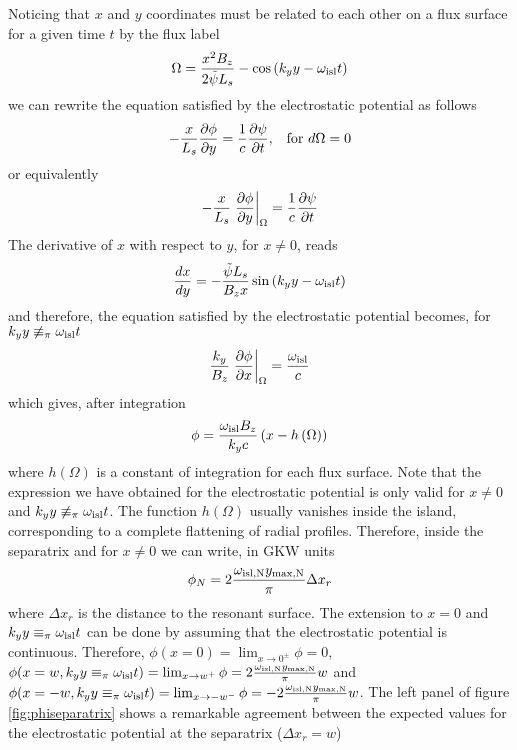 Noticing that $x$ and $y$ coordinates must be related to each other on a flux surface for a given time $t$ by the flux label
\begin{equation}
\Omega = {x^2B_z \over 2\tilde\psi L_s} - \cos\left(k_yy-\omega_{\rm isl}t\right)
\end{equation}
we can rewrite the equation satisfied by the electrostatic potential as follows
\begin{equation}
- {x \over L_s}{\partial\phi\over\partial y} = {1\over c}{\partial \psi\over\partial t},\,\,\,\,\,{\rm for}\,\,d\Omega=0
\end{equation}
or equivalently
\begin{equation}
- {x \over L_s}\left.{\partial\phi\over\partial y}\right\vert_{\Omega} = {1\over c}{\partial \psi\over\partial t}
\end{equation}
The derivative of $x$ with respect to $y$, for $x\ne 0$, reads
\begin{equation}
{dx\over dy} = -{\tilde\psi L_s\over B_z x}\sin\left(k_yy-\omega_{\rm isl}t\right)
\end{equation}
and therefore, the equation satisfied by the electrostatic potential becomes, for $k_yy\not\equiv_\pi\omega_{\rm isl}t$
\begin{equation}
{k_y\over B_z}\left.{\partial\phi\over\partial x}\right\vert_{\Omega} = {\omega_{\rm isl}\over c}
\end{equation}
which gives, after integration
\begin{equation}
\phi = {\omega_{\rm isl}B_z\over k_y c}\left(x-h\left(\Omega\right)\right)
\end{equation}
where $h\left(\Omega\right)$ is a constant of integration for each flux surface. Note that the expression we have obtained for the electrostatic potential is only valid for $x\ne 0$ and $k_yy\not\equiv_\pi\omega_{\rm isl}t$. The function $h\left(\Omega\right)$ usually vanishes inside the island, corresponding to a complete flattening of radial profiles. Therefore, inside the separatrix and for $x\ne 0$ we can write, in GKW units
\begin{equation}
\phi_N = 2{\omega_{\rm isl,N}y_{\rm max,N}\over \pi}\Delta x_r
\end{equation}
where $\Delta x_r$ is the distance to the resonant surface. The extension to $x=0$ and $k_yy\equiv_\pi\omega_{\rm isl}t$ can be done by assuming that the electrostatic potential is continuous. Therefore, $\phi(x=0)=\lim_{x\rightarrow 0^\pm}\phi = 0$, $\phi(x=w,k_yy\equiv_\pi\omega_{\rm isl}t)=\lim_{x\rightarrow w^+}\phi = 2{\omega_{\rm isl,N}y_{\rm max,N}\over \pi}w$ and $\phi(x=-w,k_yy\equiv_\pi\omega_{\rm isl}t)=\lim_{x\rightarrow -w^-}\phi = -2{\omega_{\rm isl,N}y_{\rm max,N}\over \pi}w$. The left panel of figure \ref{fig:phiseparatrix} shows a remarkable agreement between the expected values for the electrostatic potential at the separatrix ($\Delta x_r = w$)
